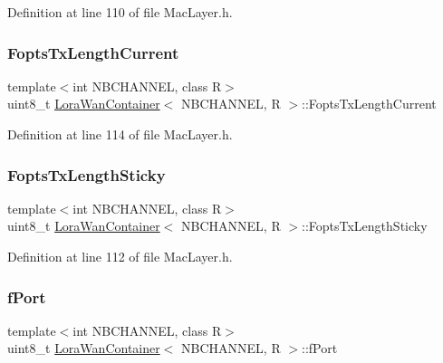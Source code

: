 Definition at line 110 of file Mac\+Layer.\+h.

\mbox{\label{class_lora_wan_container_ac9cc778ff97f8fb9182d9b8a99f6d08b}} 
\subsubsection{\texorpdfstring{Fopts\+Tx\+Length\+Current}{FoptsTxLengthCurrent}}
{\footnotesize\ttfamily template$<$int N\+B\+C\+H\+A\+N\+N\+EL, class R$>$ \\
uint8\+\_\+t \mbox{\hyperlink{class_lora_wan_container}{Lora\+Wan\+Container}}$<$ N\+B\+C\+H\+A\+N\+N\+EL, R $>$\+::Fopts\+Tx\+Length\+Current}



Definition at line 114 of file Mac\+Layer.\+h.

\mbox{\label{class_lora_wan_container_ac4263086bb1fcf19feb2fdeeeecac82c}} 
\subsubsection{\texorpdfstring{Fopts\+Tx\+Length\+Sticky}{FoptsTxLengthSticky}}
{\footnotesize\ttfamily template$<$int N\+B\+C\+H\+A\+N\+N\+EL, class R$>$ \\
uint8\+\_\+t \mbox{\hyperlink{class_lora_wan_container}{Lora\+Wan\+Container}}$<$ N\+B\+C\+H\+A\+N\+N\+EL, R $>$\+::Fopts\+Tx\+Length\+Sticky}



Definition at line 112 of file Mac\+Layer.\+h.

\mbox{\label{class_lora_wan_container_aefbb9daa1fdad56b7b3a7cd24d55d45f}} 
\subsubsection{\texorpdfstring{f\+Port}{fPort}}
{\footnotesize\ttfamily template$<$int N\+B\+C\+H\+A\+N\+N\+EL, class R$>$ \\
uint8\+\_\+t \mbox{\hyperlink{class_lora_wan_container}{Lora\+Wan\+Container}}$<$ N\+B\+C\+H\+A\+N\+N\+EL, R $>$\+::f\+Port}



